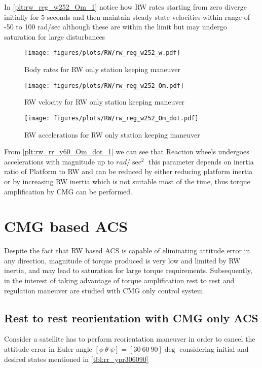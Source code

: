 \noindent In \autoref{plt:rw_reg_w252_Om_1} notice how RW rates starting from zero diverge initially for 5 seconds and then maintain steady state velocities within range of -50 to 100 rad/sec although these are within the limit but may undergo saturation for large disturbances

\begin{figure}[H]
    \centering
    \texttt{[image: figures/plots/RW/rw\_reg\_w252\_w.pdf]}
    \caption{Body rates for RW only station keeping maneuver}
    \label{plt:rw_reg_w252_w_1}
\end{figure}


\begin{figure}[H]
    \centering
    \texttt{[image: figures/plots/RW/rw\_reg\_w252\_Om.pdf]}
    \caption{RW velocity for RW only station keeping maneuver}
    \label{plt:rw_reg_w252_Om_1}
\end{figure}

\begin{figure}[H]
    \centering
    \texttt{[image: figures/plots/RW/rw\_reg\_w252\_Om\_dot.pdf]}
    \caption{RW accelerations for RW only station keeping maneuver}
    \label{plt:rw_rw_reg_w252_Om_dot_1}
\end{figure}
\noindent From \autoref{plt:rw_rr_y60_Om_dot_1} we can see that Reaction wheels undergoes accelerations with magnitude up to $rad /\sec^2$ this parameter depends on inertia ratio of Platform to RW and can be reduced by either reducing platform inertia or by increasing RW inertia which is not suitable most of the time, thus torque amplification by CMG can be performed.
\section{CMG based ACS}
Despite the fact that RW based ACS is capable of eliminating attitude error in any direction, magnitude of torque produced is very low and limited by RW inertia, and may lead to saturation for large torque requirements. Subsequently, in the interest of taking advantage of torque amplification rest to rest and regulation maneuver are studied with CMG only control system.  
\subsection{Rest to rest reorientation with CMG only ACS}
Consider a satellite has to perform reorientation maneuver in order to cancel the attitude error in Euler angle $[\phi \ \theta \ \psi] = [30 \ 60 \ 90] \deg$ considering initial and desired states mentioned in \autoref{tbl:rr_ypr306090}


